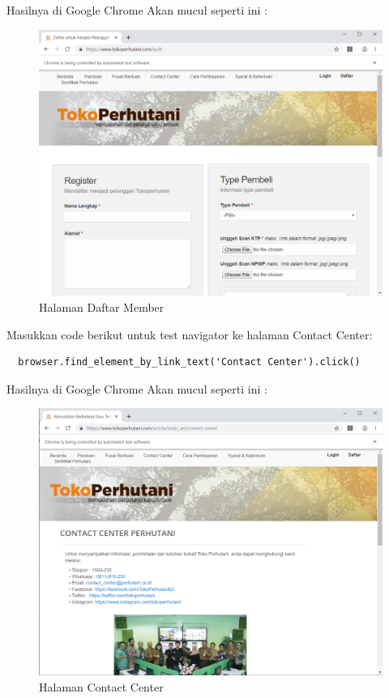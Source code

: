 Hasilnya  di Google Chrome Akan mucul seperti ini :
\begin{figure}[h]
\centering
\includegraphics[scale=0.3]{figures/3daftar}
\caption{Halaman Daftar Member}
\end{figure}

Masukkan code berikut untuk test navigator ke halaman Contact Center:
\begin{verbatim}
  browser.find_element_by_link_text('Contact Center').click()
\end{verbatim}

Hasilnya  di Google Chrome Akan mucul seperti ini :
\begin{figure}[h]
	\centering
	\includegraphics[scale=0.3]{figures/4kontak}
	\caption{Halaman Contact Center}
\end{figure}

